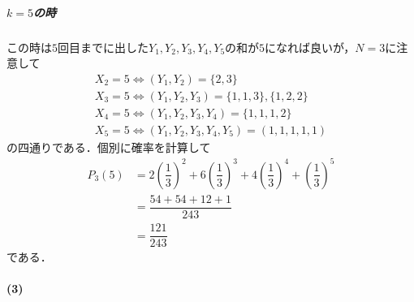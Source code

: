 \documentclass[../../main.tex]{subfiles}
\begin{document}
\subparagraph{$k=5$の時}
この時は$5$回目までに出した$Y_1,Y_2,Y_3,Y_4,Y_5$の和が$5$になれば良いが，$N=3$に注意して
\begin{align}
  X_2 = 5 \iff (Y_1,Y_2) = \{2,3\} \\
  X_3 = 5 \iff (Y_1,Y_2,Y_3) = \{1,1,3\}, \{1,2,2\} \\
  X_4 = 5 \iff (Y_1,Y_2,Y_3,Y_4) = \{1,1,1,2\} \\
  X_5 = 5 \iff (Y_1,Y_2,Y_3,Y_4,Y_5) = (1,1,1,1,1)
\end{align}
の四通りである．個別に確率を計算して
\begin{align}
  P_3(5)
  &=2\left(\dfrac{1}{3}\right)^2+6\left(\dfrac{1}{3}\right)^3+4\left(\dfrac{1}{3}\right)^4+\left(\dfrac{1}{3}\right)^5 \\
  &=\dfrac{54+54+12+1}{243} \\
  &=\dfrac{121}{243}
\end{align}
である．
\casesend

\paragraph{(3)}
\end{document}

